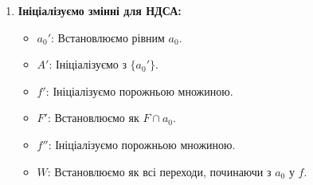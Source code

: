 \documentclass[12pt,a4paper]{article}
\begin{document}
\begin{enumerate}
    \item \textbf{Ініціалізуємо змінні для НДСА:}
    \begin{itemize}
        \item \( a_0' \): Встановлюємо рівним \( a_0 \).
        \item \( A' \): Ініціалізуємо з \( \{a_0'\} \).
        \item \( f' \): Ініціалізуємо порожньою множиною.
        \item \( F' \): Встановлюємо як \( F \cap a_0 \).
        \item \( f'' \): Ініціалізуємо порожньою множиною.
        \item \( W \): Встановлюємо як всі переходи, починаючи з \( a_0 \) у \( f \).
    \end{itemize}


\end{enumerate}
\end{document}
